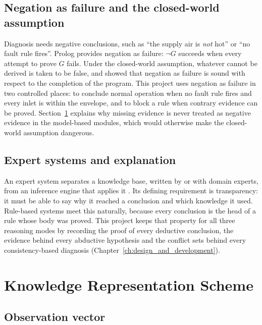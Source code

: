 \subsection{Negation as failure and the closed-world assumption}

Diagnosis needs negative conclusions, such as ``the supply air is \emph{not} hot'' or ``no fault rule fires''. Prolog provides negation as failure: $\neg G$ succeeds when every attempt to prove $G$ fails. Under the closed-world assumption, whatever cannot be derived is taken to be false, and \textcite{clark1978} showed that negation as failure is sound with respect to the completion of the program. This project uses negation as failure in two controlled places: to conclude normal operation when no fault rule fires and every inlet is within the envelope, and to block a rule when contrary evidence can be proved. Section~\ref{sec:kr-scheme} explains why missing evidence is never treated as negative evidence in the model-based modules, which would otherwise make the closed-world assumption dangerous.

\subsection{Expert systems and explanation}

An expert system separates a knowledge base, written by or with domain experts, from an inference engine that applies it \parencite{jackson1998}. Its defining requirement is transparency: it must be able to say why it reached a conclusion and which knowledge it used. Rule-based systems meet this naturally, because every conclusion is the head of a rule whose body was proved. This project keeps that property for all three reasoning modes by recording the proof of every deductive conclusion, the evidence behind every abductive hypothesis and the conflict sets behind every consistency-based diagnosis (Chapter~\ref{ch:design_and_development}).

\section{Knowledge Representation Scheme}
\label{sec:kr-scheme}

\subsection{Observation vector}

